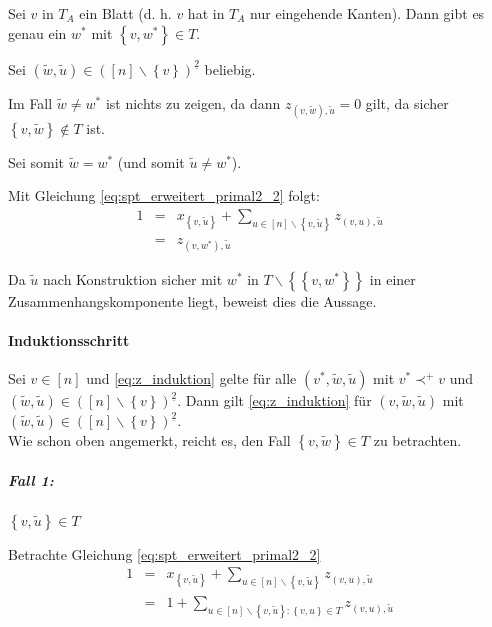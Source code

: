 \documentclass[10p,a4paper,BCOR = 12mm, DIV=15]{scrbook}
\begin{document}
\begin{bew}
Sei $v$ in $T_A$ ein Blatt (d. h. $v$ hat in $T_A$ nur eingehende Kanten). Dann gibt es genau ein $w^*$ mit $\left\{v, w^*\right\}\in T$.

Sei $\left(\widetilde{w}, \widetilde{u}\right)\in \left(\left[n\right]\backslash \left\{v\right\}\right)^{\underline{2}}$ beliebig.

Im Fall $\widetilde{w}\neq w^*$ ist nichts zu zeigen, da dann $z_{\left(v, \widetilde{w}\right), \widetilde{u}} = 0$ gilt, da sicher $\left\{v, \widetilde{w}\right\}\notin T$ ist.

Sei somit $\widetilde{w} = w^*$ (und somit $\widetilde{u}\neq w^*$).

Mit Gleichung \eqref{eq:spt_erweitert_primal2_2} folgt:
\begin{eqnarray*}
1 & = & x_{\left\{v, \widetilde{u}\right\}} + \sum_{u\in[n]\backslash\left\{v, \widetilde{u}\right\}} z_{\left(v, u\right), \widetilde{u}} \\
& = & z_{\left(v, w^*\right), \widetilde{u}}
\end{eqnarray*}

Da $\widetilde{u}$ nach Konstruktion sicher mit $w^*$ in $T\backslash \left\{\left\{v, w^*\right\}\right\}$ in einer Zusammenhangskomponente liegt, beweist dies die Aussage.

\paragraph{Induktionsschritt} Sei $v\in \left[n\right]$ und \eqref{eq:z_induktion} gelte für alle $\left(v^*, \widetilde{w}, \widetilde{u}\right)$ mit $v^*\prec^+ v$ und $\left(\widetilde{w}, \widetilde{u}\right)\in \left(\left[n\right]\backslash \left\{v\right\}\right)^{\underline{2}}$. Dann gilt \eqref{eq:z_induktion} für $\left(v, \widetilde{w}, \widetilde{u}\right)$ mit $\left(\widetilde{w}, \widetilde{u}\right)\in \left(\left[n\right]\backslash \left\{v\right\}\right)^{\underline{2}}$. \\

Wie schon oben angemerkt, reicht es, den Fall $\left\{v, \widetilde{w}\right\}\in T$ zu betrachten.

\subparagraph{Fall 1:} $\left\{v, \widetilde{u}\right\}\in T$

Betrachte Gleichung \eqref{eq:spt_erweitert_primal2_2}
\begin{eqnarray*}
1 & = & x_{\left\{v, \widetilde{u}\right\}} + \sum_{u\in[n]\backslash\left\{v, \widetilde{u}\right\}} z_{\left(v, u\right), \widetilde{u}} \\
& = & 1 + \sum_{u\in[n]\backslash\left\{v, \widetilde{u}\right\}: \left\{v, u\right\}\in T} z_{\left(v, u\right), \widetilde{u}}
\end{eqnarray*}


\end{bew}
\end{document}
